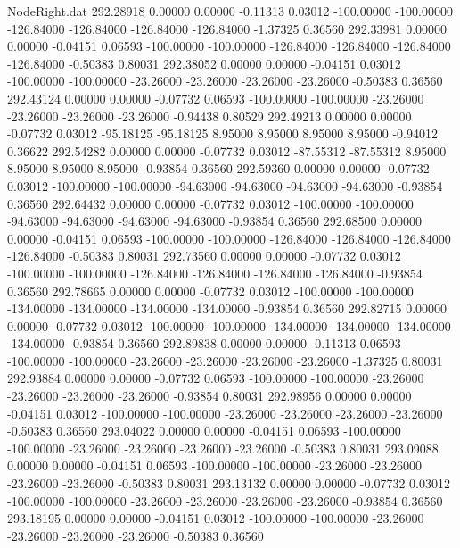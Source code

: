 \begin{filecontents}{NodeRight.dat}
 292.28918    0.00000    0.00000    -0.11313    0.03012 -100.00000 -100.00000 -126.84000 -126.84000 -126.84000 -126.84000   -1.37325    0.36560
 292.33981    0.00000    0.00000    -0.04151    0.06593 -100.00000 -100.00000 -126.84000 -126.84000 -126.84000 -126.84000   -0.50383    0.80031
 292.38052    0.00000    0.00000    -0.04151    0.03012 -100.00000 -100.00000  -23.26000  -23.26000  -23.26000  -23.26000   -0.50383    0.36560
 292.43124    0.00000    0.00000    -0.07732    0.06593 -100.00000 -100.00000  -23.26000  -23.26000  -23.26000  -23.26000   -0.94438    0.80529
 292.49213    0.00000    0.00000    -0.07732    0.03012  -95.18125  -95.18125    8.95000    8.95000    8.95000    8.95000   -0.94012    0.36622
 292.54282    0.00000    0.00000    -0.07732    0.03012  -87.55312  -87.55312    8.95000    8.95000    8.95000    8.95000   -0.93854    0.36560
 292.59360    0.00000    0.00000    -0.07732    0.03012 -100.00000 -100.00000  -94.63000  -94.63000  -94.63000  -94.63000   -0.93854    0.36560
 292.64432    0.00000    0.00000    -0.07732    0.03012 -100.00000 -100.00000  -94.63000  -94.63000  -94.63000  -94.63000   -0.93854    0.36560
 292.68500    0.00000    0.00000    -0.04151    0.06593 -100.00000 -100.00000 -126.84000 -126.84000 -126.84000 -126.84000   -0.50383    0.80031
 292.73560    0.00000    0.00000    -0.07732    0.03012 -100.00000 -100.00000 -126.84000 -126.84000 -126.84000 -126.84000   -0.93854    0.36560
 292.78665    0.00000    0.00000    -0.07732    0.03012 -100.00000 -100.00000 -134.00000 -134.00000 -134.00000 -134.00000   -0.93854    0.36560
 292.82715    0.00000    0.00000    -0.07732    0.03012 -100.00000 -100.00000 -134.00000 -134.00000 -134.00000 -134.00000   -0.93854    0.36560
 292.89838    0.00000    0.00000    -0.11313    0.06593 -100.00000 -100.00000  -23.26000  -23.26000  -23.26000  -23.26000   -1.37325    0.80031
 292.93884    0.00000    0.00000    -0.07732    0.06593 -100.00000 -100.00000  -23.26000  -23.26000  -23.26000  -23.26000   -0.93854    0.80031
 292.98956    0.00000    0.00000    -0.04151    0.03012 -100.00000 -100.00000  -23.26000  -23.26000  -23.26000  -23.26000   -0.50383    0.36560
 293.04022    0.00000    0.00000    -0.04151    0.06593 -100.00000 -100.00000  -23.26000  -23.26000  -23.26000  -23.26000   -0.50383    0.80031
 293.09088    0.00000    0.00000    -0.04151    0.06593 -100.00000 -100.00000  -23.26000  -23.26000  -23.26000  -23.26000   -0.50383    0.80031
 293.13132    0.00000    0.00000    -0.07732    0.03012 -100.00000 -100.00000  -23.26000  -23.26000  -23.26000  -23.26000   -0.93854    0.36560
 293.18195    0.00000    0.00000    -0.04151    0.03012 -100.00000 -100.00000  -23.26000  -23.26000  -23.26000  -23.26000   -0.50383    0.36560

\end{filecontents}
